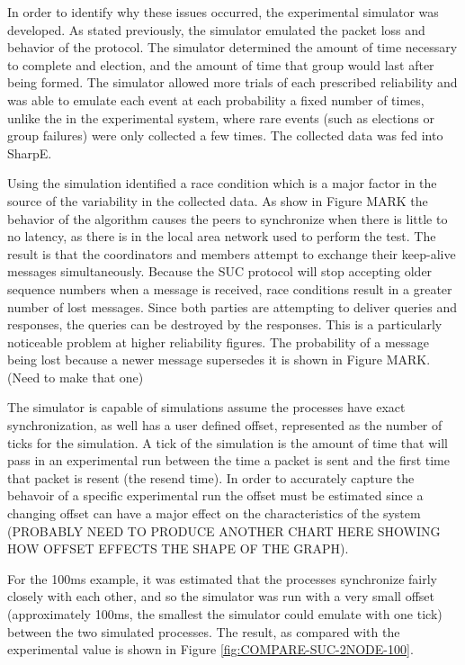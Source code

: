 In order to identify why these issues occurred, the experimental simulator was
developed. As stated previously, the simulator emulated the packet loss and
behavior of the protocol. The simulator determined the amount of time necessary
to complete and election, and the amount of time that group would last after
being formed. The simulator allowed more trials of each prescribed reliability
and was able to emulate each event at each probability a fixed number of times,
unlike the in the experimental system, where rare events (such as elections
or group failures) were only collected a few times. The collected data was fed
into SharpE.

Using the simulation identified a race condition which is a major factor in the
source of the variability in the collected data. As show in Figure MARK the 
behavior of the algorithm causes the peers to synchronize when there is little
to no latency, as there is in the local area network used to perform the test.
The result is that the coordinators and members attempt to exchange their
keep-alive messages simultaneously. Because the SUC protocol will stop accepting
older sequence numbers when a message is received, race conditions result in
a greater number of lost messages. Since both parties are attempting to
deliver queries and responses, the queries can be destroyed by the responses.
This is a particularly noticeable problem at higher reliability figures. The
probability of a message being lost because a newer message supersedes it
is shown in Figure MARK. (Need to make that one)

The simulator is capable of simulations assume the processes have exact
synchronization, as well has a user defined offset, represented as the number
of ticks for the simulation. A tick of the simulation is the amount of time
that will pass in an experimental run between the time a packet is sent and
the first time that packet is resent (the resend time). In order to accurately
capture the behavoir of a specific experimental run the offset must be estimated
since a changing offset can have a major effect on the characteristics of the
system (PROBABLY NEED TO PRODUCE ANOTHER CHART HERE SHOWING HOW OFFSET EFFECTS THE SHAPE OF THE GRAPH).

For the 100ms example, it was estimated that the processes synchronize fairly
closely with each other, and so the simulator was run with a very small offset (approximately 100ms, the smallest the simulator could emulate with one tick)
between the two simulated processes. The result, as compared with the
experimental value is shown in Figure \ref{fig:COMPARE-SUC-2NODE-100}.

